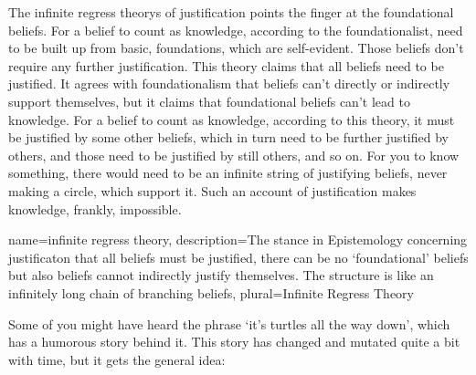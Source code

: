 The \glspl{infinite regress theory} of justification points the finger at the foundational beliefs. For a belief to count as knowledge, according to the foundationalist, need to be built up from basic, foundations, which are self-evident. Those beliefs don't require any further justification. This theory claims that all beliefs need to be justified. It agrees with foundationalism that beliefs can't directly or indirectly support themselves, but it claims that foundational beliefs can't lead to knowledge. For a belief to count as knowledge, according to this theory, it must be justified by some other beliefs, which in turn need to be further justified by others, and those need to be justified by still others, and so on. For you to know something, there would need to be an infinite string of justifying beliefs, never making a circle, which support it. Such an account of justification makes knowledge, frankly, impossible.

{
name=infinite regress theory,
description={The stance in Epistemology concerning justificaton that all beliefs must be justified, there can be no `foundational' beliefs but also beliefs cannot indirectly justify themselves. The structure is like an infinitely long chain of branching beliefs},
plural=Infinite Regress Theory
}


Some of you might have heard the phrase `it's turtles all the way down', which has a humorous story behind it.  This story has changed and mutated quite a bit with time, but it gets the general idea:


